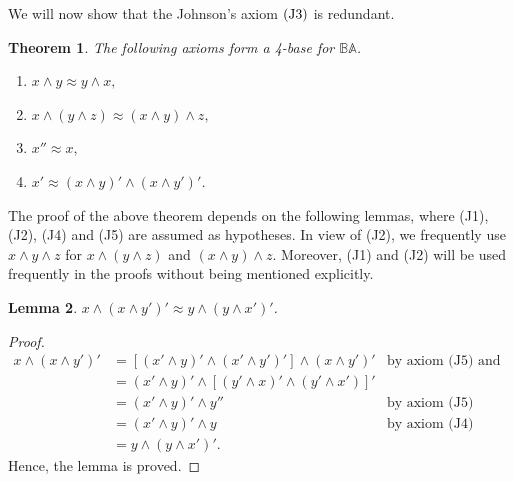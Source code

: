 \documentclass{amsart}
\theoremstyle{plain}
\newtheorem{theorem}{Theorem}[section]
\newtheorem{lemma}[theorem]{Lemma}
\theoremstyle{problem}
\theoremstyle{definition}
\theoremstyle{remark}
\numberwithin{equation}{section}
\begin{document}

We will now show that the Johnson's axiom $\rm (J3)$ is redundant. 

\begin{theorem} \label{T2.2}
    The following axioms form a 4-base for $\mathbb{BA}$. 
\begin{enumerate}
   \item[{\rm(J1)}] $x \land y \approx y \land x,$
     \item[{\rm(J2)}] ${x \land ( y \land z )\approx (x \land y) \land z},$
   \item[{\rm(J4)}]  ${x'' \approx x},$
   \item[{\rm(J5)}] ${x' \approx (x \land y)' \land (x \land y')'}$.
\end{enumerate}
\end{theorem}

        The proof of the above theorem depends on the following lemmas, where (J1), (J2), (J4) and (J5) are assumed as hypotheses. In view of (J2), we frequently use $x \land y \land z$ for $x \land (y \land z)$ and $(x \land y) \land z$.  Moreover,  (J1) and (J2) will be used frequently in the proofs without being mentioned explicitly.
   

 


\begin{lemma} \label{23} 
    ${x \land (x \land y')' \approx y \land (y \land x' )'}$.    
\end{lemma}
\begin{proof}
\begin{align*}
    x \land (x \land y')'
    &= [(x' \land y)' \land (x' \land y')'] \land (x \land y')'  &\text{by axiom (J5) and (J4)}\\
    &=(x' \land y)' \land [(y' \land x)' \land (y' \land x')]'\\
    &= (x' \land y)' \land y'' &\text {by axiom (J5)}\\
    &= (x' \land y)' \land y &\text {by axiom (J4)}\\
    &= y \land (y \land x')'.
\end{align*}
Hence, the lemma is proved.
\end{proof}
\end{document}
